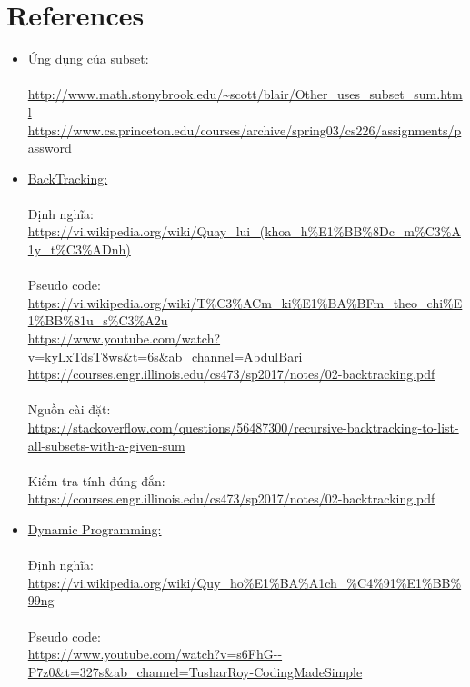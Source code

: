 \documentclass{article}
\begin{document}
    \section{\fontsize{20}{20}\selectfont References}
    \begin{itemize}
        \item \underline{Ứng dụng của subset:}\\\\
        \url{http://www.math.stonybrook.edu/~scott/blair/Other_uses_subset_sum.html}\\
        \url{https://www.cs.princeton.edu/courses/archive/spring03/cs226/assignments/password}\\
        \item  \underline{BackTracking:}\\\\
         Định nghĩa:\\ \url{https://vi.wikipedia.org/wiki/Quay_lui_(khoa_h%E1%BB%8Dc_m%C3%A1y_t%C3%ADnh) }\\\\
         Pseudo code:\\ \url{https://vi.wikipedia.org/wiki/T%C3%ACm_ki%E1%BA%BFm_theo_chi%E1%BB%81u_s%C3%A2u}\\
         \url{https://www.youtube.com/watch?v=kyLxTdsT8ws&t=6s&ab_channel=AbdulBari}\\
	    \url{https://courses.engr.illinois.edu/cs473/sp2017/notes/02-backtracking.pdf}\\\\
	     Nguồn cài đặt:\\ \url{https://stackoverflow.com/questions/56487300/recursive-backtracking-to-list-all-subsets-with-a-given-sum}\\\\
	      Kiểm tra tính đúng đắn:\\ \url{https://courses.engr.illinois.edu/cs473/sp2017/notes/02-backtracking.pdf}\\
	      \item  \underline{Dynamic Programming:}\\\\
	      Định nghĩa:\\ \url{https://vi.wikipedia.org/wiki/Quy_ho%E1%BA%A1ch_%C4%91%E1%BB%99ng}\\\\
	      Pseudo code:\\ \url{https://www.youtube.com/watch?v=s6FhG--P7z0&t=327s&ab_channel=TusharRoy-CodingMadeSimple}\\

\end{itemize}
\end{document}
